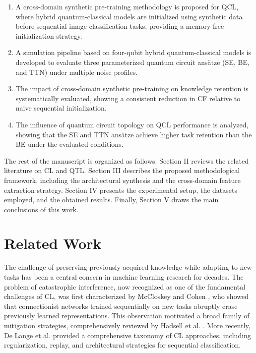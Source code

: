 \documentclass[conference]{IEEEtran}
\begin{document}
\begin{enumerate}
\item A cross-domain synthetic pre-training methodology is proposed for QCL, where hybrid quantum-classical models are initialized using synthetic data before sequential image classification tasks, providing a memory-free initialization strategy.
\item A simulation pipeline based on four-qubit hybrid quantum-classical models is developed to evaluate three parameterized quantum circuit ans\"atze (SE, BE, and TTN) under multiple noise profiles.
\item The impact of cross-domain synthetic pre-training on knowledge retention is systematically evaluated, showing a consistent reduction in CF relative to naive sequential initialization.
\item The influence of quantum circuit topology on QCL performance is analyzed, showing that the SE and TTN ans\"atze achieve higher task retention than the BE under the evaluated conditions.
\end{enumerate}

The rest of the manuscript is organized as follows. Section II reviews the related literature on CL and QTL. Section III describes the proposed methodological framework, including the architectural synthesis and the cross-domain feature extraction strategy. Section IV presents the experimental setup, the datasets employed, and the obtained results. Finally, Section V draws the main conclusions of this work.

\section{Related Work}
The challenge of preserving previously acquired knowledge while adapting to new tasks has been a central concern in machine learning research for decades. The problem of catastrophic interference, now recognized as one of the fundamental challenges of CL, was first characterized by McCloskey and Cohen \cite{b16}, who showed that connectionist networks trained sequentially on new tasks abruptly erase previously learned representations. This observation motivated a broad family of mitigation strategies, comprehensively reviewed by Hadsell et al. \cite{b17}. More recently, De Lange et al. \cite{b18} provided a comprehensive taxonomy of CL approaches, including regularization, replay, and architectural strategies for sequential classification.
\end{document}
